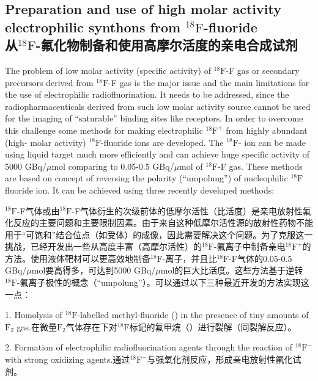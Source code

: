\documentclass[dvipsnames, svgnames,a4paper,11pt]{article}
\begin{document}
\subsection{Preparation and use of high molar activity electrophilic synthons from ${}^\mathrm{18}\mathrm{F}$-fluoride \\从${}^\mathrm{18}\mathrm{F}$-氟化物制备和使用高摩尔活度的亲电合成试剂}


The problem of low molar activity (specific activity) of ${}^\mathrm{18}\mathrm{F}$-F gas or secondary
precursors derived from ${}^\mathrm{18}\mathrm{F}$-F gas is the major issue and the main limitations for the
use of electrophilic radiofluorination. It needs to be addressed, since the
radiopharmaceuticals derived from such low molar activity source cannot be used for
the imaging of “saturable” binding sites like receptors. In order to overcome this
challenge some methods for making electrophilic {${}^\mathrm{18}\mathrm{F}^+$} from highly abundant (high-
molar activity) ${}^\mathrm{18}\mathrm{F}$-fluoride ions are developed. The ${}^\mathrm{18}\mathrm{F}$- ion can be made using liquid
target much more efficiently and can achieve huge specific activity of 5000
GBq/$\mu$mol comparing to 0.05-0.5 GBq/$\mu$mol of ${}^\mathrm{18}\mathrm{F}$-F gas. These methods are based
on concept of reversing the polarity (“umpolung”) of nucleophilic ${}^\mathrm{18}\mathrm{F}$ fluoride ion. It
can be achieved using three recently developed methods:

${}^\mathrm{18}\mathrm{F}$-F气体或由${}^\mathrm{18}\mathrm{F}$-F气体衍生的次级前体的低摩尔活性（比活度）是亲电放射性氟化反应的主要问题和主要限制因素。由于来自这种低摩尔活性源的放射性药物不能用于“可饱和”结合位点（如受体）的成像，因此需要解决这个问题。为了克服这一挑战，已经开发出一些从高度丰富（高摩尔活性）的${}^\mathrm{18}\mathrm{F}$-氟离子中制备亲电{${}^\mathrm{18}\mathrm{F}^+$}的方法。使用液体靶材可以更高效地制备${}^\mathrm{18}\mathrm{F}$-离子，并且比${}^\mathrm{18}\mathrm{F}$-F气体的0.05-0.5 GBq/$\mu$mol要高得多，可达到5000 GBq/$\mu$mol的巨大比活度。这些方法基于逆转${}^\mathrm{18}\mathrm{F}$-氟离子极性的概念（“umpolung”）。可以通过以下三种最近开发的方法实现这一点：

1. Homolysis of ${}^\mathrm{18}\mathrm{F}$-labelled methyl-fluoride () in the presence of tiny amounts of $\mathrm{F}_2$ gas.在微量$\mathrm{F}_2$气体存在下对${}^\mathrm{18}\mathrm{F}$标记的氟甲烷（）进行裂解（同裂解反应）。

2. Formation of electrophilic radiofluorination agents through the reaction of ${}^\mathrm{18}\mathrm{F}^-$ with strong oxidizing agents.通过${}^\mathrm{18}\mathrm{F}^-$与强氧化剂反应，形成亲电放射性氟化试剂。
\end{document}
